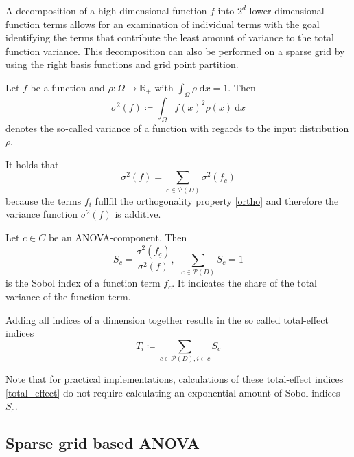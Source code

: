 \documentclass[
  a4paper,  %
  twoside,  %
  bibliography=totoc,
  headsepline,
  cleardoublepage=empty,
  parskip=half,
  draft=false
]{scrbook}
\begin{document}
A decomposition of a high dimensional function $f$ into $2^d$ lower dimensional function terms allows for an examination of individual terms with the goal identifying the terms that contribute the least amount of variance to the total function variance.
This decomposition can also be performed on a sparse grid by using the right basis functions and grid point partition.

\begin{definition}[Variance]
Let $f$ be a function and $\rho \colon \Omega \to \mathds{R_+}$ with $\int_{\Omega} \rho \; \text{d}x = 1$.
Then
\begin{equation}
\sigma^2(f) \coloneqq \int_{\Omega} f(x)^2 \rho(x) ~ \text{d} x
\end{equation}
denotes the so-called variance of a function with regards to the input distribution $\rho$.
\end{definition}

It holds that 
\begin{equation}
\sigma^2(f)=\sum_{c \in \mathcal{P}(D)} \sigma^2(f_c)
\end{equation}
because the terms $f_i$ fullfil the orthogonality property \eqref{ortho} and therefore the variance function $\sigma^2(f)$ is additive.

\begin{definition}
Let $c \in C$ be an ANOVA-component.
Then
\begin{equation}
S_{c}=\frac{\sigma^2(f_{\underline{c}} )}{\sigma^2(f)}, ~~ \sum_{c \in \mathcal{P}(D)} S_{c} = 1
\nonumber
\end{equation}
is the Sobol index of a function term $f_c$. It indicates the share of the total variance of the function term.
\end{definition}


\begin{definition}
Adding all indices of a dimension together results in the so called total-effect indices 
\begin{equation}
T_i \coloneqq \sum_{c \in \mathcal{P}(D), i \in c} S_{c}
\label{total_effect}
\end{equation}
\end{definition}
Note that for practical implementations, calculations of these total-effect indices \eqref{total_effect} do not require calculating an exponential amount of Sobol indices $S_{c}$.

\newpage
\subsection{Sparse grid based ANOVA}
\end{document}
